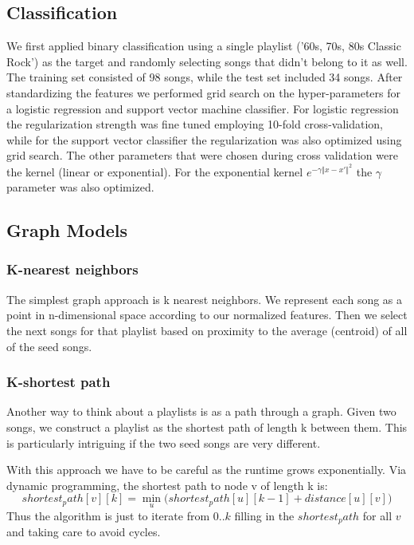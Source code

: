 \documentclass[acmtog]{acmart}
\begin{document}
\subsection{Classification}

We first applied binary classification using a single playlist ('60s, 70s, 80s Classic Rock') as the target and randomly selecting songs that didn't belong to it as well. The training set consisted of 98 songs, while the test set included 34 songs. After standardizing the features we performed grid search on the hyper-parameters for a logistic regression and support vector machine classifier. For logistic regression the regularization strength was fine tuned employing 10-fold cross-validation, while for the support vector classifier the regularization was also optimized using grid search. The other parameters that were chosen during cross validation were the kernel (linear or exponential). For the exponential kernel $e^{-\gamma {\Vert x -x' \Vert}^{2}}$ the $\gamma$ parameter was also optimized. \cite{PythonMachineLearning}

\subsection{Graph Models}

\subsubsection{K-nearest neighbors}
The simplest graph approach is k nearest neighbors. We represent each song as a point in n-dimensional space according to our normalized features. Then we select the next songs for that playlist based on proximity to the average (centroid) of all of the seed songs.

\subsubsection{K-shortest path}

Another way to think about a playlists is as a path through a graph. Given two songs, we construct a playlist as the shortest path of length k between them. This is particularly intriguing if the two seed songs are very different.

With this approach we have to be careful as the runtime grows exponentially. Via dynamic programming, the shortest path to node v of length k is:
\[
  shortest_path[v][k] = \min_u \Big ( shortest_path[u][k-1] + distance[u][v] \Big)
\]
Thus the algorithm is just to iterate from $0..k$ filling in the $shortest_path$ for all $v$ and taking care to avoid cycles.
\end{document}
